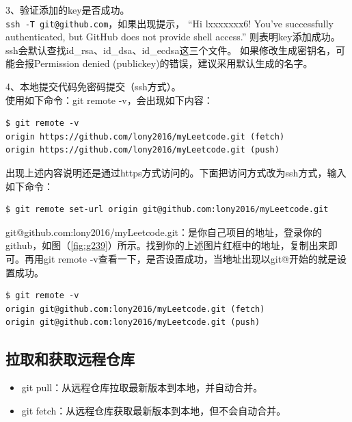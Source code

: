 3、验证添加的key是否成功。\\
\verb|ssh -T git@github.com|，如果出现提示，
“Hi lxxxxxxx6! You’ve successfully authenticated, but GitHub does not provide shell access.”
则表明key添加成功。
ssh会默认查找id\_rsa、id\_dsa、id\_ecdsa这三个文件。
如果修改生成密钥名，可能会报Permission denied (publickey)的错误，建议采用默认生成的名字。

4、本地提交代码免密码提交（ssh方式）。\\
使用如下命令：git remote -v，会出现如下内容：
\begin{verbatim}
$ git remote -v
origin https://github.com/lony2016/myLeetcode.git (fetch)
origin https://github.com/lony2016/myLeetcode.git (push)
\end{verbatim}
出现上述内容说明还是通过https方式访问的。下面把访问方式改为ssh方式，输入如下命令：
\begin{verbatim}
$ git remote set-url origin git@github.com:lony2016/myLeetcode.git
\end{verbatim}
git@github.com:lony2016/myLeetcode.git：是你自己项目的地址，登录你的github，如图（\ref{fig:g239}）所示。找到你的上述图片红框中的地址，复制出来即可。再用git remote -v查看一下，是否设置成功，当地址出现以git@开始的就是设置成功。
\begin{verbatim}
$ git remote -v
origin git@github.com:lony2016/myLeetcode.git (fetch)
origin git@github.com:lony2016/myLeetcode.git (push)
\end{verbatim}





\subsection{拉取和获取远程仓库}
\begin{itemize}
\item git pull：从远程仓库拉取最新版本到本地，并自动合并。
\item git fetch：从远程仓库获取最新版本到本地，但不会自动合并。
\end{itemize}


